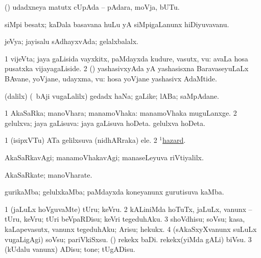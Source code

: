 \bentry
{}
\gl{\nA}
\bmng
(\ashi) udadxneya matutx cUpAda -- pAdara, moVja, bUTu. 
\emng
\eentry

\bentry
{}
\gl{\nA}
\bmng
siMpi besatx; kaDala basavana huLu yA siMpigaLanunx hiDiyuvavanu. 
\emng
\eentry

\bentry
{}
\gl{\gu}
\bmng
jeVya; jayisalu sAdhayxvAda; gelalxbalalx. 
\emng
\eentry

\bentry
{}
\gl{\nA}
\bmng
\bnum
\num{1} vijeVta; jaya gaLisida vayxkitx, paMdayxda kudure, vasutx, \mo vu:  avaLa hosa pusatxka vijayagaLiside. 
\num{2} (\AmA) yashasivxyAda yA yashasisxna BaravaseyuLaLx BAvane, yoVjane, udayxma, \mo vu:  hosa yoVjane yashasivx AdaMtide. 
\enum
\emng
\eentry

\bentry
{} 
\gl{\nA}
\expl{}
\bmng
(\bava dalilx) (\kanmu\ bAji \mo vugaLalilx) gedadx haNa; gaLike; lABa; saMpAdane. 
\emng
\eentry

\bentry
{} 
\gl{\gu}
\expl{}
\bmng
\bnum
\num{1} AkaSaRka; manoVhara; manamoVhaka:  manamoVhaka muguLanxge. 
\num{2} gelulxva; jaya gaLisuva:  jaya gaLisuva hoDeta.  gelulxva hoDeta. 
\enum
\emng

\noindent 
\gl{\pagu}
\expl{}
\bmng
\bnum
\num{1}  (isipxVTu) ATa gelilxsuva (nidhARraka) ele. 
\num{2}  \hyperref{kandict_h.pdf}{H}{hazard(1) pagu(4)}{$^1$hazard}. 
\enum
\emng
\eentry

\bentry
{}
\gl{\kirxvi}
\bmng
AkaSaRkavAgi; manamoVhakavAgi; manaseLeyuva riVtiyalilx. 
\emng
\eentry

\bentry
{}
\gl{\nA}
\bmng
AkaSaRkate; manoVharate. 
\emng
\eentry

\bentry
{}
\gl{\nA}
\bmng
gurikaMba; gelulxkaMba; paMdayxda koneyanunx gurutisuva kaMba. 
\emng
\eentry

\bentry
{}
\gl{\sakirx}
\bmng
\bnum
\num{1} (jaLuLx hoVguvaMte) tUru; keVru. 
\num{2} kALiniMda hoTuTx, jaLuLx, \mo vanunx -- tUru, keVru; tUri beVpaRDisu; keVri tegeduhAku. 
\num{3} shoVdhisu; soVsu; kasa, kaLapevasutx, \mo vanunx tegeduhAku; Arisu; hekukx. 
\num{4} (sAkaSxyXvanunx suLuLx \mo vugaLigAgi) soVsu; pariVkiSxsu. 
 (\kAparx) 
\banum
{} rekekx baDi. 
 rekekx(yiMda gALi) biVsu. 
\eanum
\numie
\num{3} (kUdalu \mo vanunx) ADisu; tone; tUgADisu. 
\enum
\emng
\eentry

